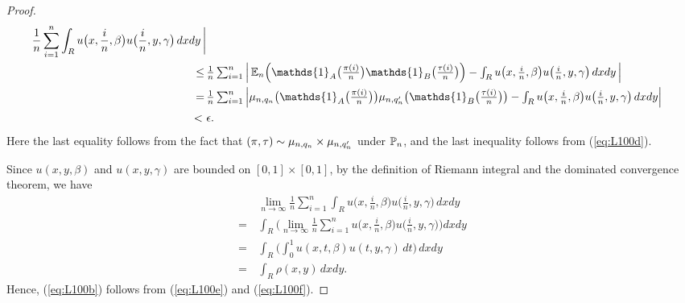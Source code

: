 \begin{proof}
\begin{align}
           \frac{1}{n}\sum_{i=1}^{n}\int_R u\big(x, \frac{i}{n}, \beta \big)u\big(\frac{i}{n}, y, \gamma \big)\, dxdy \, \bigg| \nonumber\\
  \le\,&\textstyle \frac{1}{n}\sum_{i=1}^{n} \Big| \, \E_n \Big(\mathds{1}_A\big(\frac{\pi(i)}{n}\big) \mathds{1}_B\big(\frac{\tau(i)}{n}\big)\Big) -
         \int_R u\big(x, \frac{i}{n}, \beta \big)u\big(\frac{i}{n}, y, \gamma \big)\, dxdy \, \Big| \nonumber\\
  =\,&\textstyle \frac{1}{n}\sum_{i=1}^{n} \Big| \n \big(\mathds{1}_A\big(\frac{\pi(i)}{n}\big) \big) \mu_{n, q'_n} \big(\mathds{1}_B\big(\frac{\tau(i)}{n}\big) \big) -
     \int_R u\big(x, \frac{i}{n}, \beta \big)u\big(\frac{i}{n}, y, \gamma \big)\, dxdy \Big| \nonumber\\
  <\ & \epsilon.   \nonumber
\end{align}
Here the last equality follows from the fact that $(\pi, \tau) \sim \mu_{n, q_n} \times \mu_{n, q'_n}$ under $\mathbb{P}_n$, and the last inequality follows from (\ref{eq:L100d}).

Since $u(x, y, \beta)$ and $u(x, y, \gamma)$ are bounded on $[0, 1]\times[0, 1]$, by the definition of Riemann integral and the dominated convergence theorem, we have
\begin{align}
  &\textstyle\lim\limits_{n \to \infty}\frac{1}{n}\sum_{i=1}^{n}\int_R u\big(x, \frac{i}{n}, \beta \big)u\big(\frac{i}{n}, y, \gamma \big)\, dxdy   \label{eq:L100f}\\
  =\,&\textstyle \int_R \Big(\lim\limits_{n \to \infty}\frac{1}{n}\sum_{i=1}^{n}u\big(x, \frac{i}{n}, \beta \big)u\big(\frac{i}{n}, y, \gamma \big)\Big)dxdy \nonumber\\
  =\,&\textstyle \int_R \Big(\int_0^1 u(x, t, \beta) u(t, y, \gamma) \,dt\Big)\,dxdy \nonumber\\
  =\,&\textstyle \int_R \rho(x, y)\, dxdy. \nonumber
\end{align}
Hence, (\ref{eq:L100b}) follows from (\ref{eq:L100e}) and (\ref{eq:L100f}).




\end{proof}
